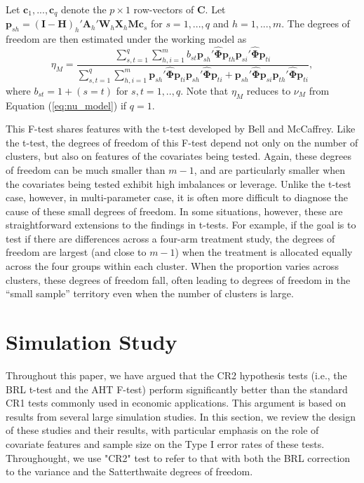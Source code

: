 \documentclass[12pt]{article}\usepackage[]{graphicx}\usepackage[]{color}
\newcommand{\bm}{\mathbf}
\newcommand{\bs}{\boldsymbol}
\begin{document}
Let $\bm{c}_1,...,\bm{c}_q$ denote the $p \times 1$ row-vectors of $\bm{C}$. 
Let $\bm{p}_{sh} = \left(\bm{I} - \bm{H}\right)_h'\bm{A}_h'\bm{W}_h\bm{X}_h\bm{M}\bm{c}_s$ for $s = 1,...,q$ and $h = 1,...,m$. 
The degrees of freedom are then estimated under the working model as
\begin{equation}
\label{eq:eta_model}
\eta_M = \frac{\sum_{s,t=1}^q \sum_{h,i=1}^m b_{st} \bm{p}_{sh}'\hat{\bs\Phi}\bm{p}_{th} \bm{p}_{si}'\hat{\bs\Phi}\bm{p}_{ti}}{\sum_{s,t=1}^q \sum_{h,i=1}^m \bm{p}_{sh}'\hat{\bs\Phi}\bm{p}_{ti} \bm{p}_{sh}'\hat{\bs\Phi}\bm{p}_{ti} + \bm{p}_{sh}'\hat{\bs\Phi}\bm{p}_{si} \bm{p}_{th}'\hat{\bs\Phi}\bm{p}_{ti}},
\end{equation}
where $b_{st} = 1 + (s=t)$ for $s,t=1,..,q$.
Note that $\eta_M$ reduces to $\nu_M$ from Equation (\ref{eq:nu_model}) if $q = 1$.

This F-test shares features with the t-test developed by Bell and McCaffrey. Like the t-test, the degrees of freedom of this F-test depend not only on the number of clusters, but also on features of the covariates being tested. 
Again, these degrees of freedom can be much smaller than $m - 1$, and are particularly smaller when the covariates being tested exhibit high imbalances or leverage. 
Unlike the t-test case, however, in multi-parameter case, it is often more difficult to diagnose the cause of these small degrees of freedom. 
In some situations, however, these are straightforward extensions to the findings in t-tests. 
For example, if the goal is to test if there are differences across a four-arm treatment study, the degrees of freedom are largest (and close to $m - 1$) when the treatment is allocated equally across the four groups within each cluster. 
When the proportion varies across clusters, these degrees of freedom fall, often leading to degrees of freedom in the ``small sample'' territory even when the number of clusters is large. 

\section{Simulation Study}



Throughout this paper, we have argued that the CR2 hypothesis tests (i.e., the BRL t-test and the AHT F-test) perform significantly better than the standard CR1 tests commonly used in economic applications. 
This argument is based on results from several large simulation studies. 
In this section, we review the design of these studies and their results, with particular emphasis on the role of covariate features and sample size on the Type I error rates of these tests.
Throughought, we use "CR2" test to refer to that with both the BRL correction to the variance and the Satterthwaite degrees of freedom. 
\end{document}
